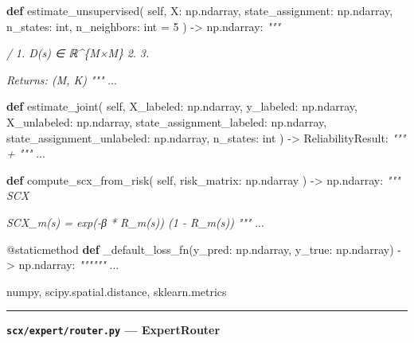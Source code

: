 \documentclass[
  12pt,
]{article}
\newenvironment{Shaded}{}{}
\newcommand{\AttributeTok}[1]{\textcolor[rgb]{0.49,0.56,0.16}{#1}}
\newcommand{\BuiltInTok}[1]{\textcolor[rgb]{0.00,0.50,0.00}{#1}}
\newcommand{\CommentTok}[1]{\textcolor[rgb]{0.38,0.63,0.69}{\textit{#1}}}
\newcommand{\DecValTok}[1]{\textcolor[rgb]{0.25,0.63,0.44}{#1}}
\newcommand{\KeywordTok}[1]{\textcolor[rgb]{0.00,0.44,0.13}{\textbf{#1}}}
\newcommand{\NormalTok}[1]{#1}
\newcommand{\OperatorTok}[1]{\textcolor[rgb]{0.40,0.40,0.40}{#1}}
\newcommand{\VariableTok}[1]{\textcolor[rgb]{0.10,0.09,0.49}{#1}}
\begin{document}
\begin{Shaded}
\begin{Highlighting}[]
    \KeywordTok{def}\NormalTok{ estimate\_unsupervised(}
        \VariableTok{self}\NormalTok{,}
\NormalTok{        X: np.ndarray,}
\NormalTok{        state\_assignment: np.ndarray,}
\NormalTok{        n\_states: }\BuiltInTok{int}\NormalTok{,}
\NormalTok{        n\_neighbors: }\BuiltInTok{int} \OperatorTok{=} \DecValTok{5}
\NormalTok{    ) }\OperatorTok{{-}\textgreater{}}\NormalTok{ np.ndarray:}
        \CommentTok{"""}

\CommentTok{        /}
\CommentTok{        1.  D(s) ∈ ℝ\^{}\{M×M\}}
\CommentTok{        2. }
\CommentTok{        3. }

\CommentTok{        Returns: (M, K) }
\CommentTok{        """}
\NormalTok{        ...}

    \KeywordTok{def}\NormalTok{ estimate\_joint(}
        \VariableTok{self}\NormalTok{,}
\NormalTok{        X\_labeled: np.ndarray, y\_labeled: np.ndarray,}
\NormalTok{        X\_unlabeled: np.ndarray,}
\NormalTok{        state\_assignment\_labeled: np.ndarray,}
\NormalTok{        state\_assignment\_unlabeled: np.ndarray,}
\NormalTok{        n\_states: }\BuiltInTok{int}
\NormalTok{    ) }\OperatorTok{{-}\textgreater{}}\NormalTok{ ReliabilityResult:}
        \CommentTok{""" + """}
\NormalTok{        ...}

    \KeywordTok{def}\NormalTok{ compute\_scx\_from\_risk(}
        \VariableTok{self}\NormalTok{, risk\_matrix: np.ndarray}
\NormalTok{    ) }\OperatorTok{{-}\textgreater{}}\NormalTok{ np.ndarray:}
        \CommentTok{""" SCX }

\CommentTok{        SCX\_m(s) = exp({-}β * R\_m(s))   (1 {-} R\_m(s)) }
\CommentTok{        """}
\NormalTok{        ...}

    \AttributeTok{@staticmethod}
    \KeywordTok{def}\NormalTok{ \_default\_loss\_fn(y\_pred: np.ndarray, y\_true: np.ndarray) }\OperatorTok{{-}\textgreater{}}\NormalTok{ np.ndarray:}
        \CommentTok{""""""}
\NormalTok{        ...}
\end{Highlighting}
\end{Shaded}

numpy, scipy.spatial.distance, sklearn.metrics

\begin{center}\rule{0.5\linewidth}{0.5pt}\end{center}

\textbf{\texttt{scx/expert/router.py} --- ExpertRouter}
\end{document}

